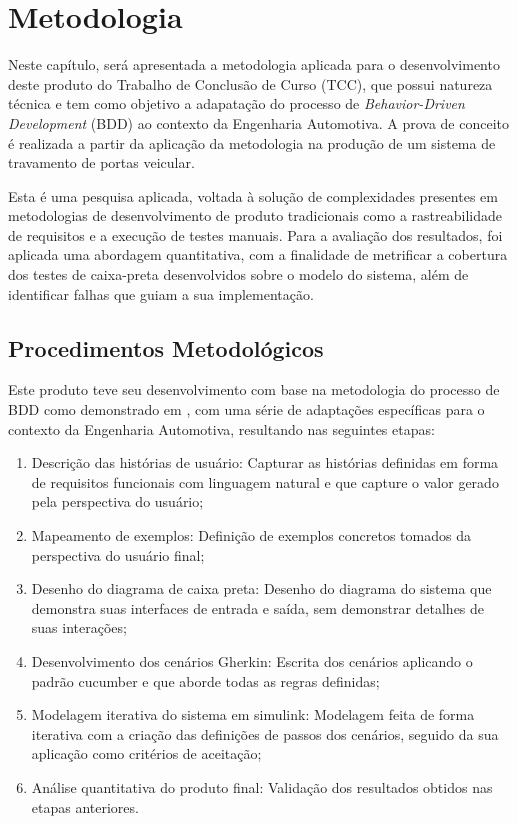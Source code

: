 \chapter{Metodologia} \label{ch:MM} %
Neste capítulo, será apresentada a metodologia aplicada para o desenvolvimento deste produto do Trabalho de Conclusão de Curso (TCC), que possui natureza técnica 
e tem como objetivo a adapatação do processo de \textit{Behavior-Driven Development} (BDD) ao contexto da Engenharia Automotiva. A prova de conceito é realizada a 
partir da aplicação da metodologia na produção de um sistema de travamento de portas veicular. 

Esta é uma pesquisa aplicada, voltada à solução de complexidades presentes em metodologias de desenvolvimento de produto tradicionais como a rastreabilidade de 
requisitos e a execução de testes manuais. Para a avaliação dos resultados, foi aplicada uma abordagem quantitativa, com a finalidade de metrificar a cobertura 
dos testes de caixa-preta desenvolvidos sobre o modelo do sistema, além de identificar falhas que guiam a sua implementação. 

\section{\textbf{Procedimentos Metodológicos}}
Este produto teve seu desenvolvimento com base na metodologia do processo de BDD como demonstrado em , com uma série de adaptações específicas 
para o contexto da Engenharia Automotiva, resultando nas seguintes etapas:
\begin{enumerate}
    \item Descrição das histórias de usuário: Capturar as histórias definidas em forma de requisitos funcionais com linguagem natural e que capture o valor 
    gerado pela perspectiva do usuário;
    \item Mapeamento de exemplos: Definição de exemplos concretos tomados da perspectiva do usuário final;
    \item Desenho do diagrama de caixa preta: Desenho do diagrama do sistema que demonstra suas interfaces de entrada e saída, sem demonstrar detalhes de suas interações;
    \item Desenvolvimento dos cenários Gherkin: Escrita dos cenários aplicando o padrão cucumber e que aborde todas as regras definidas;
    \item Modelagem iterativa do sistema em simulink: Modelagem feita de forma iterativa com a criação das definições de passos dos cenários, seguido da sua aplicação como critérios de aceitação;
    \item Análise quantitativa do produto final: Validação dos resultados obtidos nas etapas anteriores.
\end{enumerate}

